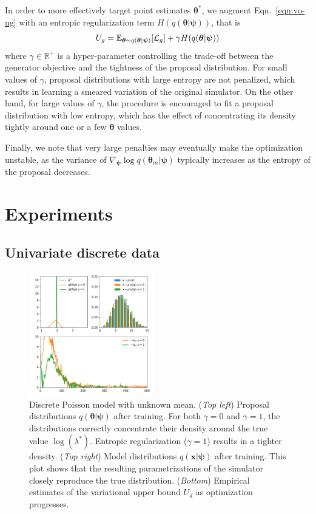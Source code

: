 \documentclass{article}
\newcommand{\qxpsi}{q(\mathbf{x}|\bfpsi)}
\newcommand{\bftheta}{{\bm \theta}}
\newcommand{\bfpsi}{{\bm \psi}}
\theoremstyle{plain}
\begin{document}
In order to more effectively target
point estimates $\bftheta^*$, we augment Eqn.~\ref{eqn:vo-ug} with
an entropic regularization term $H(q(\bftheta|\bfpsi))$, that is
\begin{equation}
U_g = \mathbb{E}_{\bftheta \sim q(\bftheta|\bfpsi)} [ {\cal L}_g ] + \gamma H(q(\bftheta|\bfpsi))
\end{equation}
where $\gamma \in \mathbb{R}^+$ is a hyper-parameter controlling the trade-off
between the generator objective and the tightness of the proposal distribution.
For small values of $\gamma$,
proposal distributions with large entropy are not penalized, which results
in learning a smeared variation of the original simulator. On the other hand,
for large values of $\gamma$, the procedure is encouraged to fit a proposal
distribution with low entropy, which has the effect of concentrating its density
tightly around one or a few $\bftheta$ values.

Finally, we note that very large penalties may
eventually make the optimization unstable, as the variance of $\nabla_\bfpsi \log q(\bftheta_m|\bfpsi)$
typically increases as the entropy of the proposal decreases.



\section{Experiments}

\subsection{Univariate discrete data}

\begin{figure}[h]
\centering
\includegraphics[width=0.48\textwidth]{figures/poisson.pdf}
\caption{Discrete Poisson model with unknown mean.
 ({\it Top left}) Proposal distributions $q(\bftheta|\bfpsi)$ after training. For both $\gamma=0$ and $\gamma=1$, the distributions correctly concentrate their density around
            the true value $\log(\lambda^*)$. Entropic regularization ($\gamma=1$) results in a tighter density.
 ({\it Top right}) Model distributions $\qxpsi$ after training. This plot shows that the resulting parametrizations of the simulator closely reproduce the true distribution.
 ({\it Bottom}) Empirical estimates of the variational upper bound $U_d$ as optimization progresses.
 }\label{fig:poisson}
\end{figure}
\end{document}
